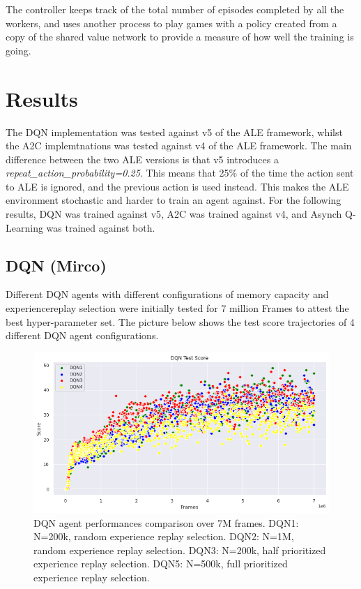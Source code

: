 \documentclass{article}
\begin{document}
The controller keeps track of the total number of episodes completed by all the workers, and uses another process to play games with a policy created from a copy of the shared value network to provide a measure of how well the training is going.


\section{Results}

The DQN implementation was tested against v5 of the ALE framework, whilst the A2C implemtnations was tested against v4 of the ALE framework. The main difference between the two ALE versions is that v5 introduces a \emph{repeat\_action\_probability=0.25}. This  means that  25\% of the time the action sent to ALE is ignored, and the previous action is used instead. This makes the ALE environment stochastic and harder to train an agent against. For the following results, DQN was trained against v5, A2C was trained against v4, and Asynch Q-Learning was trained against both.


\subsection{DQN (Mirco)}

Different DQN agents with different configurations of memory capacity and experiencereplay selection were initially tested for 7 million Frames to attest the best hyper-parameter set. The picture below shows the test score trajectories of 4 different DQN agent configurations. 
\begin{figure}[H]
\centering
\includegraphics[scale=0.5]{DQNAgentComparison.PNG}
\caption[width=0.7\textwidth]{DQN agent performances comparison over 7M frames. DQN1: N=200k, random experience replay selection. DQN2: N=1M, random experience replay selection. DQN3: N=200k, half prioritized experience replay selection. DQN5: N=500k, full prioritized experience replay selection.}
\label{fig:DQNAgentComparison}
\end{figure}
\end{document}
